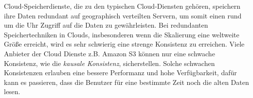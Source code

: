 Cloud-Speicherdienste, die zu den typischen Cloud-Diensten gehören, speichern ihre Daten redundant auf geographisch verteilten Servern, um somit einen rund um die Uhr Zugriff auf die Daten zu gewährleisten.
Bei redundanten Speichertechniken in Clouds, insbesonderen wenn die Skalierung eine weltweite Größe erreicht, wird es sehr schwierig eine strenge Konsistenz zu erreichen. Viele Anbieter der Cloud Dienste z.B. Amazon S3 können nur eine schwache Konsistenz, wie die \textit{kausale Konsistenz}, sicherstellen. Solche schwachen Konsistenzen erlauben eine bessere Performanz und hohe Verfügbarkeit, dafür kann es passieren, dass die Benutzer für eine bestimmte Zeit noch die alten Daten lesen.\cite{consistency-as-a-service} 


